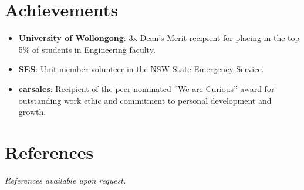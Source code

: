 \documentclass[letterpaper,11pt]{article}
\newcommand{\resumeItem}[2]{
  \item\small{
    \textbf{#1}{: #2 \vspace{-2pt}}
  }
}
\newcommand{\resumeSubItem}[2]{\resumeItem{#1}{#2}\vspace{-4pt}}
\newcommand{\resumeSubHeadingListStart}{\begin{itemize}[leftmargin=*]}
\newcommand{\resumeSubHeadingListEnd}{\end{itemize}}
\begin{document}
\section{Achievements}
  \resumeSubHeadingListStart
    \resumeSubItem{University of Wollongong}
      {3x Dean's Merit recipient for placing in the top 5\% of students in Engineering faculty.}
    \resumeSubItem{SES}
      {Unit member volunteer in the NSW State Emergency Service.}
    \resumeSubItem{carsales}
      {Recipient of the peer-nominated ”We are Curious” award for outstanding work ethic and commitment to personal development and growth.}
  \resumeSubHeadingListEnd

\section{References}
  \textit{References available upon request.}

\end{document}
